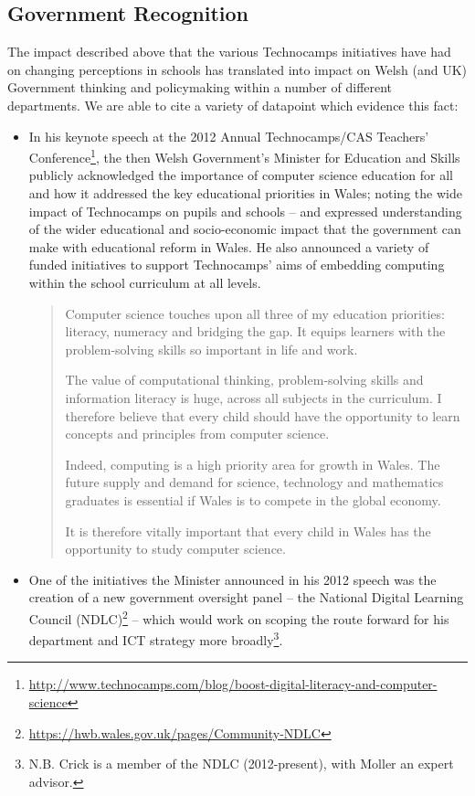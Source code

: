 \documentclass{sig-alternate}
\begin{document}
\subsection{Government Recognition}

The impact described above that the various Technocamps initiatives
have had on changing perceptions in schools has translated into impact
on Welsh (and UK) Government thinking and policymaking within a number
of different departments. We are able to cite a variety of datapoint
which evidence this fact:

\begin{itemize}

\item
In his keynote speech at the 2012 Annual Technocamps/CAS Teachers'
Conference\footnote{\url{http://www.technocamps.com/blog/boost-digital-literacy-and-computer-science}},
the then Welsh Government's Minister for Education and Skills publicly
acknowledged the importance of computer science education for all and
how it addressed the key educational priorities in Wales; noting the
wide impact of Technocamps on pupils and schools -- and expressed
understanding of the wider educational and socio-economic impact that
the government can make with educational reform in Wales. He also
announced a variety of funded initiatives to support Technocamps' aims
of embedding computing within the school curriculum at all levels.

\begin{quotation}
Computer science touches upon all three of my education priorities:
literacy, numeracy and bridging the gap. It equips learners with the
problem-solving skills so important in life and work.

The value of computational thinking, problem-solving skills and
information literacy is huge, across all subjects in the curriculum. I
therefore believe that every child should have the opportunity to
learn concepts and principles from computer science.

Indeed, computing is a high priority area for growth in Wales. The
future supply and demand for science, technology and mathematics
graduates is essential if Wales is to compete in the global economy.

It is therefore vitally important that every child in Wales has the
opportunity to study computer science.
\end{quotation}

\item
One of the initiatives the Minister announced in his 2012 speech was
the creation of a new government oversight panel -- the National
Digital Learning Council
(NDLC)\footnote{\url{https://hwb.wales.gov.uk/pages/Community-NDLC}}
-- which would work on scoping the route forward for his department
and ICT strategy more broadly\footnote{N.B. Crick is a member of the
NDLC (2012-present), with Moller an expert advisor.}.


\end{itemize}
\end{document}
